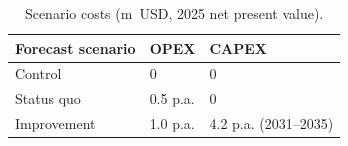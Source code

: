 \begin{table}
\caption{Scenario costs (m~USD, 2025 net present value).}
\label{tab:scenario_costs_KHM}
\centering
\begin{tabular}{lll}
\toprule
Forecast scenario & OPEX & CAPEX \\
\midrule
Control & 0 & 0 \\
Status quo & 0.5 p.a. & 0 \\
Improvement & 1.0 p.a. & 4.2 p.a. (2031--2035) \\
\bottomrule
\end{tabular}
\end{table}
